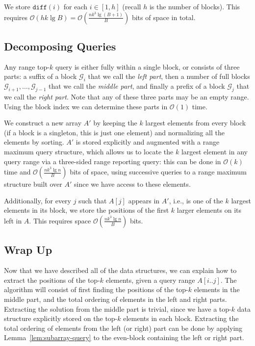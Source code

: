 \documentclass[runningheads]{llncs}
\newcommand{\Oh}{\mathcal{O}}
\begin{document}
We store $\texttt{diff}(i)$ for each $i \in [1,h]$ (recall $h$ is the
number of blocks).  This requires $\Oh(hk\lg B) =
\Oh(\frac{nk^3\lg(B+1)}{B})$ bits of space in total.



\subsection{Decomposing Queries}

Any range top-$k$ query is either fully within a single block, or
consists of three parts: a suffix of a block $\mathcal{G}_{i}$ that we
call the \emph{left part}, then a number of full blocks
$\mathcal{G}_{i+1},\ldots,\mathcal{G}_{j-1}$ that we call the
\emph{middle part}, and finally a prefix of a block $\mathcal{G}_{j}$
that we call the \emph{right part}.  Note that any of these three
parts may be an empty range. Using the block index we can determine
these parts in $\Oh(1)$ time.

We construct a new array $A'$ by keeping the $k$ largest elements from
every block (if a block is a singleton, this is just one element) and
normalizing all the elements by sorting. $A'$ is stored explicitly and
augmented with a range maximum query structure, which allows us to
locate the $k$ largest element in any query range via a three-sided
range reporting query: this can be done in $\Oh(k)$ time and
$\Oh(\frac{nk^3\lg n}{B})$ bits of space, using successive queries to a range
maximum structure built over $A'$ since we have access to these
elements.

Additionally, for every $j$ such that $A[j]$ appears in $A'$, i.e., is
one of the $k$ largest elements in its block, we store the positions
of the first $k$ larger elements on its left in $A$. This requires
space $\Oh(\frac{nk^3 \lg n }{ B})$ bits.


\subsection{Wrap Up}

Now that we have described all of the data structures, we can explain
how to extract the positions of the top-$k$ elements, given a query
range $A[i..j]$.  The algorithm will consist of first finding the
positions of the top-$k$ elements in the middle part, and the total
ordering of elements in the left and right parts.  Extracting the
solution from the middle part is trivial, since we have a top-$k$ data
structure explicitly stored on the top-$k$ elements in each block.
Extracting the total ordering of elements from the left (or right)
part can be done by applying Lemma~\ref{lem:subarray-query} to the
even-block containing the left or right part.
\end{document}
